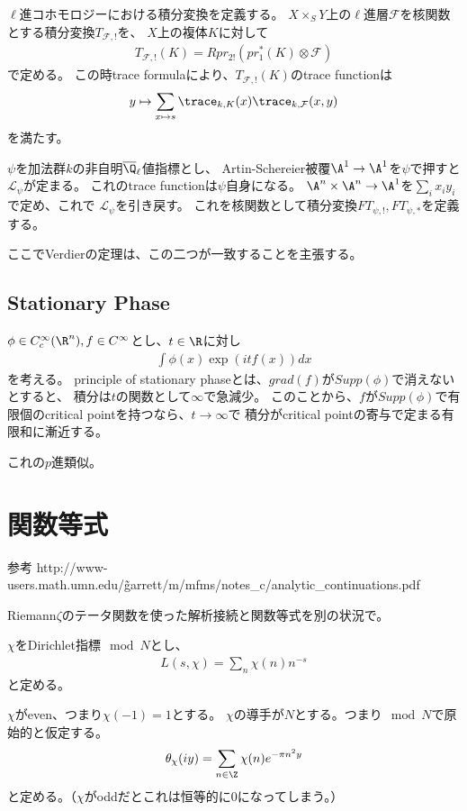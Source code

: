 \documentclass[uplatex, a4paper]{jsbook}
\begin{document}
$\ell$進コホモロジーにおける積分変換を定義する。
$X\times_SY$上の$\ell$進層$\mathcal{F}$を核関数とする積分変換$T_{\mathcal{F},!}$を、
$X$上の複体$K$に対して
\begin{align*}
  T_{\mathcal{F},!}(K)=Rpr_{2!}(pr_1^*(K)\otimes\mathcal{F})
\end{align*}
で定める。
この時trace formulaにより、$T_{\mathcal{F},!}(K)$のtrace functionは
\begin{align*}
  y\mapsto\sum_{x\mapsto s}\trace_{k,K}(x)\trace_{k,\mathcal{F}}(x,y)
\end{align*}
を満たす。

$\psi$を加法群$k$の非自明$\overline{\Q}_\ell$値指標とし、
Artin-Schereier被覆$\A^1\to\A^1$を$\psi$で押すと$\mathcal{L}_\psi$が定まる。
これのtrace functionは$\psi$自身になる。
$\A^n\times\A^n\to \A^1$を$\sum_ix_iy_i$で定め、これで $\mathcal{L}_\psi$を引き戻す。
これを核関数として積分変換$FT_{\psi,!}, FT_{\psi,*}$を定義する。

ここでVerdierの定理は、この二つが一致することを主張する。

\section{Stationary Phase}
$\phi\in C^\infty_c(\R^n), f\in C^\infty$とし、$t\in\R$に対し
\begin{align*}
  \int\phi(x)\exp(itf(x))dx
\end{align*}
を考える。
principle of stationary phaseとは、$grad(f)$が$Supp(\phi)$で消えないとすると、
積分は$t$の関数として$\infty$で急減少。
このことから、$f$が$Supp(\phi)$で有限個のcritical pointを持つなら、$t\to \infty$で
積分がcritical pointの寄与で定まる有限和に漸近する。

これの$p$進類似。


\chapter{関数等式}

参考
http://www-users.math.umn.edu/\~garrett/m/mfms/notes\_c/analytic\_continuations.pdf

Riemann$\zeta$のテータ関数を使った解析接続と関数等式を別の状況で。

$\chi$をDirichlet指標$\mod N$とし、
\begin{align*}
  L(s,\chi)=\sum_n\chi(n)n^{-s}
\end{align*}
と定める。

$\chi$がeven、つまり$\chi(-1)=1$とする。
$\chi$の導手が$N$とする。つまり$\mod N$で原始的と仮定する。
\begin{align*}
  \theta_\chi(iy)=\sum_{n\in\Z}\chi(n)e^{-\pi n^2y}
\end{align*}
と定める。（$\chi$がoddだとこれは恒等的に$0$になってしまう。）
\end{document}
